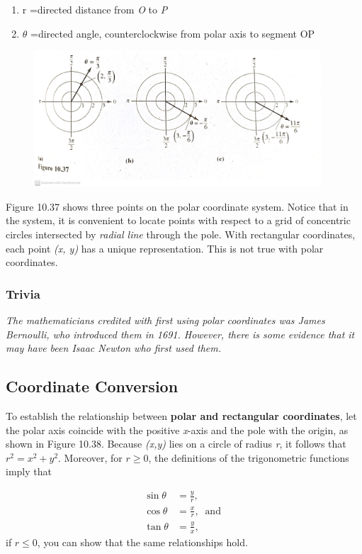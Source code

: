 \documentclass[12pt,twoside]{article}
\begin{document}
\begin{enumerate}
\item r =directed distance from \emph{O} to \emph{P}
\item $\theta$ =directed angle, counterclockwise from polar axis to segment OP
\end{enumerate}

\begin{figure}[h]
\centering
\includegraphics[height=2in]{Figure 10.37.jpg}
\end{figure}

Figure 10.37 shows three points on the polar coordinate system. Notice that in the system, it is convenient to locate points with respect to a grid of concentric circles intersected by \emph{radial line} through the pole.
With rectangular coordinates, each point \emph{(x, y)} has a unique representation. This is not true with polar coordinates.

\subsubsection{Trivia}
\textrm\emph{The mathematicians credited with first using polar coordinates was James Bernoulli, who introduced them in 1691. However, there is some evidence that it may have been Isaac Newton who first used them.}

\subsection{Coordinate Conversion}
To establish the relationship between \textbf{polar and rectangular coordinates}, let the polar axis coincide with the positive \emph{x}-axis and the pole with the origin, as shown in Figure 10.38. Because \emph{(x,y)} lies on a circle of radius \emph{r}, it follows that $r^2 = x^2 + y^2$. Moreover, for ${r}\geq 0$, the definitions of the trigonometric functions imply that
 
\begin{align*}
\sin\theta &= \frac{y}{r},\\
\cos\theta &= \frac{x}{r},\ \text{ and }\\
\tan\theta &= \frac{y}{x},
\end{align*}
if ${r}\leq 0$, you can show that the same relationships hold.
\end{document}

